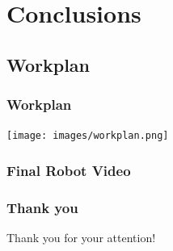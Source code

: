 \documentclass{beamer}
\begin{document}
\section{Conclusions}

\subsection{Workplan}

\begin{frame}
\frametitle{Workplan}
\begin{center}
  \texttt{[image: images/workplan.png]}
 \end{center}
\end{frame}

\begin{frame}
\frametitle{Final Robot Video}
\begin{center}
 \end{center}
\end{frame}

\begin{frame}
\frametitle{Thank you}
\begin{center}
  {\Large Thank you for your attention!}
 \end{center}
\end{frame}


\end{document}
